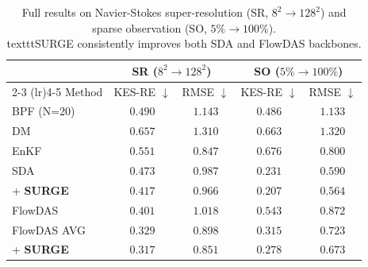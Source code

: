 \documentclass{article}
\theoremstyle{plain}
\theoremstyle{definition}
\theoremstyle{remark}
\begin{document}
\begin{table}[t]
\caption{Full results on Navier-Stokes super-resolution (SR, $8^2\to128^2$) and sparse observation (SO, $5\%\to100\%$). \\texttt{SURGE} consistently improves both SDA and FlowDAS backbones.}
\label{tab:ns_full}
\begin{center}
\begin{small}
\begin{sc}
\begin{tabular}{lcccc}
\toprule
& \multicolumn{2}{c}{SR ($8^2\to128^2$)} & \multicolumn{2}{c}{SO ($5\%\to100\%$)} \\
\cmidrule(lr){2-3} \cmidrule(lr){4-5}
Method & KES-RE $\downarrow$ & RMSE $\downarrow$ & KES-RE $\downarrow$ & RMSE $\downarrow$ \\
\midrule
BPF (N=20)              & $0.490$ & $1.143$ & $0.486$ & $1.133$ \\
DM                      & $0.657$ & $1.310$ & $0.663$ & $1.320$ \\
EnKF                    & $0.551$ & $0.847$ & $0.676$ & $0.800$ \\
SDA                     & $0.473$ & $0.987$ & $0.231$ & $0.590$ \\
\quad + \textbf{SURGE}  & $0.417$ & $0.966$ & $\mathbf{0.207}$ & $\mathbf{0.564}$ \\
FlowDAS                 & $0.401$ & $1.018$ & $0.543$ & $0.872$ \\
FlowDAS AVG             & $0.329$ & $0.898$ & $0.315$ & $0.723$ \\
\quad + \textbf{SURGE}  & $\mathbf{0.317}$ & $\mathbf{0.851}$ & $0.278$ & $0.673$ \\
\bottomrule
\end{tabular}
\end{sc}
\end{small}
\end{center}
\end{table}
\end{document}
